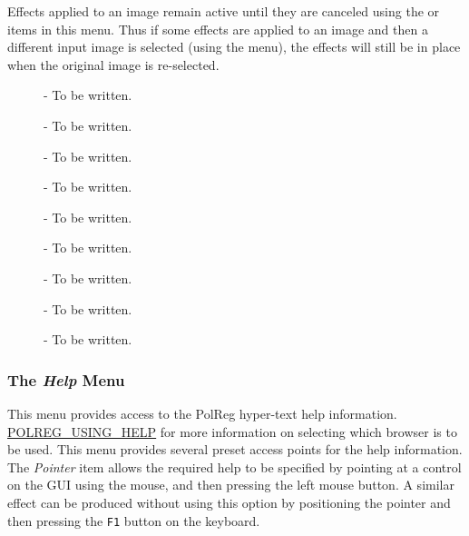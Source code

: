 Effects applied to an image remain active until they are canceled using
the  or
 items in this menu. Thus
if some effects are applied to an image and then a different input image 
is selected (using the  menu), 
the effects will still be in place when the original image is re-selected.

\begin{description}

\item [ ] - To be written.
\item [ ] - To be written.
\item [ ] - To be written.
\item [ ] - To be written.
\item [ ] - To be written.
\item [ ] - To be written.
\item [ ] - To be written.
\item [ ] - To be written.
\item [ ] - To be written.

\end{description}

\subsubsection {The {\em Help} Menu}
This menu provides access to the PolReg hyper-text help information. 
\hyperref{Go here}{See section }{}{POLREG_USING_HELP} for more information
on selecting which browser is to be used. This menu provides several preset
access points for the help information. The {\em Pointer} item allows the 
required help to be specified by pointing at a control on the GUI using the 
mouse, and then pressing the left mouse button. A similar effect can be
produced without using this option by positioning the pointer and then
pressing the {\tt F1} button on the keyboard.

